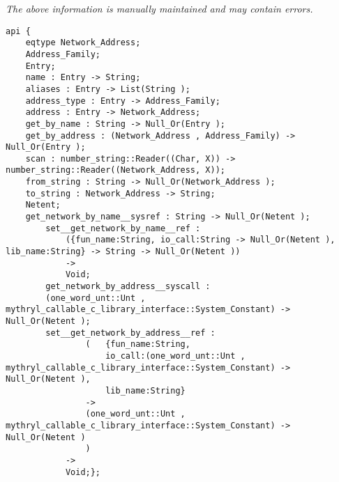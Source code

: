 \label{api:Net\_Db}

{\tiny \it The above information is manually maintained and may contain errors.}
\begin{verbatim}
api {
    eqtype Network_Address;
    Address_Family;
    Entry;
    name : Entry -> String;
    aliases : Entry -> List(String );
    address_type : Entry -> Address_Family;
    address : Entry -> Network_Address;
    get_by_name : String -> Null_Or(Entry );
    get_by_address : (Network_Address , Address_Family) -> Null_Or(Entry );
    scan : number_string::Reader((Char, X)) -> number_string::Reader((Network_Address, X));
    from_string : String -> Null_Or(Network_Address );
    to_string : Network_Address -> String;
    Netent;
    get_network_by_name__sysref : String -> Null_Or(Netent );
        set__get_network_by_name__ref :
            ({fun_name:String, io_call:String -> Null_Or(Netent ), lib_name:String} -> String -> Null_Or(Netent ))
            ->
            Void;
        get_network_by_address__syscall :
        (one_word_unt::Unt , mythryl_callable_c_library_interface::System_Constant) -> Null_Or(Netent );
        set__get_network_by_address__ref :
                (   {fun_name:String,
                    io_call:(one_word_unt::Unt , mythryl_callable_c_library_interface::System_Constant) -> Null_Or(Netent ),
                    lib_name:String}
                ->
                (one_word_unt::Unt , mythryl_callable_c_library_interface::System_Constant) -> Null_Or(Netent )
                )
            ->
            Void;};
\end{verbatim}

